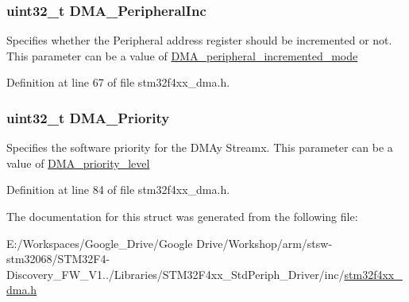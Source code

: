 \hypertarget{struct_d_m_a___init_type_def_ad0bf5e8b3968eaf8dc18e923b94acfe1}{
\subsubsection[{D\-M\-A\-\_\-\-Peripheral\-Inc}]{\setlength{\rightskip}{0pt plus 5cm}uint32\-\_\-t D\-M\-A\-\_\-\-Peripheral\-Inc}}\label{struct_d_m_a___init_type_def_ad0bf5e8b3968eaf8dc18e923b94acfe1}
Specifies whether the Peripheral address register should be incremented or not. This parameter can be a value of \hyperlink{group___d_m_a__peripheral__incremented__mode}{D\-M\-A\-\_\-peripheral\-\_\-incremented\-\_\-mode} 

Definition at line 67 of file stm32f4xx\-\_\-dma.\-h.

\hypertarget{struct_d_m_a___init_type_def_aabb62e3f5536fc15a201058a1b6bda18}{
\subsubsection[{D\-M\-A\-\_\-\-Priority}]{\setlength{\rightskip}{0pt plus 5cm}uint32\-\_\-t D\-M\-A\-\_\-\-Priority}}\label{struct_d_m_a___init_type_def_aabb62e3f5536fc15a201058a1b6bda18}
Specifies the software priority for the D\-M\-Ay Streamx. This parameter can be a value of \hyperlink{group___d_m_a__priority__level}{D\-M\-A\-\_\-priority\-\_\-level} 

Definition at line 84 of file stm32f4xx\-\_\-dma.\-h.



The documentation for this struct was generated from the following file\-:\begin{DoxyCompactItemize}
\item 
E\-:/\-Workspaces/\-Google\-\_\-\-Drive/\-Google Drive/\-Workshop/arm/stsw-\/stm32068/\-S\-T\-M32\-F4-\/\-Discovery\-\_\-\-F\-W\-\_\-\-V1../\-Libraries/\-S\-T\-M32\-F4xx\-\_\-\-Std\-Periph\-\_\-\-Driver/inc/\hyperlink{stm32f4xx__dma_8h}{stm32f4xx\-\_\-dma.\-h}\end{DoxyCompactItemize}
